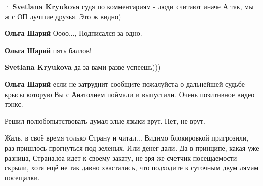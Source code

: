 \begin{itemize}
\begin{itemize}
  · 
\textbf{Svetlana Kryukova} судя по комментариям - люди считают иначе \Laughey[1.0][white]А так, мы ж с ОП лучшие друзья. Это ж видно)

 
\textbf{Ольга Шарий} Оооо..., Подписался за одно.

 
\textbf{Ольга Шарий} пять баллов!

 
\textbf{Svetlana Kryukova} да за вами разве успеешь)))

 
\textbf{Ольга Шарий} если не затруднит сообщите пожалуйста о дальнейшей судьбе крысы которую Вы с Анатолием поймали и выпустили. Очень позитивное видео тэнкс.

 
Решил полюбопытствовать думал злые языки врут. Нет, не врут.

Жаль, в своё время только Страну и читал... Видимо блокировкой пригрозили, раз
пришлось прогнуться под зеленых. Или денег дали. Да в принципе, какая уже
разница, Страна.юа идет к своему закату, не зря же счетчик посещаемости скрыли,
хотя ещё не так давно хвастались, что подходите к суточным двум лямам
посещалки.

 

\end{itemize}
\end{itemize}
